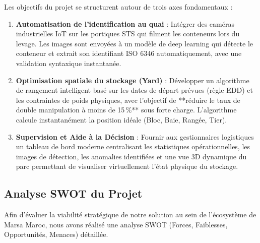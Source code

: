 \documentclass[12pt,a4paper]{article}
\begin{document}
Les objectifs du projet se structurent autour de trois axes fondamentaux :
\begin{enumerate}
  \item \textbf{Automatisation de l'identification au quai} : Intégrer des caméras industrielles IoT sur les portiques \ac{STS} qui filment les conteneurs lors du levage. Les images sont envoyées à un modèle de deep learning qui détecte le conteneur et extrait son identifiant ISO 6346 automatiquement, avec une validation syntaxique instantanée.
  \item \textbf{Optimisation spatiale du stockage (Yard)} : Développer un algorithme de rangement intelligent basé sur les dates de départ prévues (règle EDD) et les contraintes de poids physiques, avec l'objectif de **réduire le taux de double manipulation à moins de 15\,\%** sous forte charge. L'algorithme calcule instantanément la position idéale (Bloc, Baie, Rangée, Tier).
  \item \textbf{Supervision et Aide à la Décision} : Fournir aux gestionnaires logistiques un tableau de bord moderne centralisant les statistiques opérationnelles, les images de détection, les anomalies identifiées et une vue 3D dynamique du parc permettant de visualiser virtuellement l'état physique du stockage.
\end{enumerate}

\subsection{Analyse SWOT du Projet}

Afin d'évaluer la viabilité stratégique de notre solution au sein de l'écosystème de Marsa Maroc, nous avons réalisé une analyse SWOT (Forces, Faiblesses, Opportunités, Menaces) détaillée.
\end{document}

